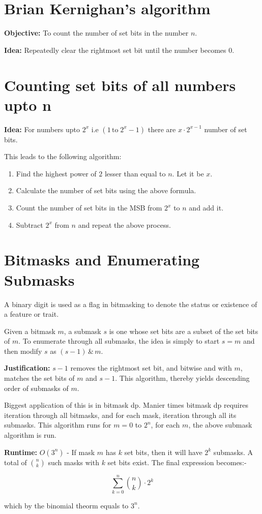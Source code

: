 \documentclass{article}
\begin{document}
	\section{Brian Kernighan's algorithm}
	\textbf{Objective:} To count the number of set bits in the number $n$. 
	
	\vspace{1.5mm}
	\textbf{Idea:} Repeatedly clear the rightmost set bit until the number becomes $0$.
	
	\section{Counting set bits of all numbers upto n}
	\textbf{Idea: } For numbers upto $2^x$ i.e $(1 \, \text{to} \; 2^x - 1)$ there are $x \cdot 2^{x - 1}$	number of set bits. \newline
	
	This leads to the following algorithm:
	\begin{enumerate}
		\item Find the highest power of $2$ lesser than equal to $n$. Let it be $x$.
		\item Calculate the number of set bits using the above formula.
		\item Count the number of set bits in the MSB from $2^x$ to $n$ and add it.
		\item Subtract $2^x$ from $n$ and repeat the above process.
	\end{enumerate}
	
	\section{Bitmasks and Enumerating Submasks}
	A binary digit is used as a flag in bitmasking to denote the status or existence of a feature or trait. \newline
	
	Given a bitmask $m$, a submask $s$ is one whose set bits are a subset of the set bits of $m$. To enumerate through all submasks, the idea is simply to start $s = m$ and then modify $s$ as $(s-1) \, \& \, m$.  \newline 
	
	\textbf{Justification:} $s-1$ removes the rightmost set bit, and bitwise and with $m$, matches the set bits of $m$ and $s-1$. This algorithm, thereby yields descending order of submasks of $m$. \newline
	
	Biggest application of this is in bitmask dp. Manier times bitmask dp requires iteration through all bitmasks, and for each mask, iteration through all its submasks. This algorithm runs for $m = 0$ to $2^n$, for each $m$, the above submask algorithm is run. \newline 
	
	\textbf{Runtime:} $O(3^n)$ - If mask  $m$ has $k$ set bits, then it will have $2^k$ submasks. A total of $\binom{n}{k}$ such masks with $k$ set bits exist. The final expression becomes:-
	
	\[
	\sum^n_{k=0} \binom{n}{k} \cdot 2^k
	\]
	
	which by the binomial theorm equals to $3^n$.
\end{document}
